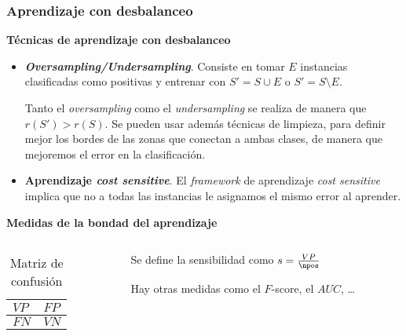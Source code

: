 \begin{frame}\frametitle{Aprendizaje con desbalanceo}
\par\textbf{Técnicas de aprendizaje con desbalanceo}
\begin{itemize}
 \item \textbf{\textit{Oversampling/Undersampling}}. Consiste en tomar $E$ instancias clasificadas como positivas y entrenar con 
 $S' = S\cup E$ o $S' = S\setminus E$.
 
 Tanto el \textit{oversampling} como el \textit{undersampling} se realiza de manera que $r(S') > r(S)$. Se pueden usar además
 técnicas de limpieza, para definir mejor los bordes de las zonas que conectan a ambas clases, de manera que mejoremos el error
 en la clasificación.
 
 \item \textbf{Aprendizaje \textit{cost sensitive}}. El \textit{framework} de aprendizaje \textit{cost sensitive} implica que no
 a todas las instancias le asignamos el mismo error al aprender.
\end{itemize}
\medskip

\par\textbf{Medidas de la bondad del aprendizaje}
\begin{columns}
 \begin{column}{0.5\textwidth}
  \begin{table}[H]
    \centering
    \begin{tabular}{C{2cm}|C{2cm}}
    $VP$ & $FP$\\
    \hline
    $FN$ & $VN$\\
    \end{tabular}
    \caption{Matriz de confusión}
  \end{table}
 \end{column}
 
 \begin{column}{0.5\textwidth}
  \begin{definition}[Sensibilidad]
   Se define la sensibilidad como $s = \frac{VP}{\npos}$ 
  \end{definition}
  
  Hay otras medidas como el $F$-score, el $AUC$, \ldots
 \end{column}
\end{columns}
\end{frame}

